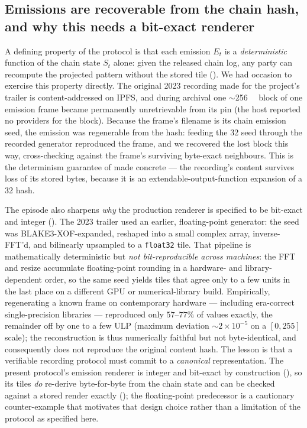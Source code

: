 \subsection{Emissions are recoverable from the chain hash, and why this needs a bit-exact renderer}
\label{sec:discussion:regeneration}

A defining property of the protocol is that each emission $E_t$ is a \emph{deterministic} function of the chain state $S_t$ alone: given the released chain log, any party can recompute the projected pattern without the stored tile (). We had occasion to exercise this property directly. The original 2023 recording made for the project's trailer is content-addressed on IPFS, and during archival one $\sim$\SI{256}{\kibi\byte} block of one emission frame became permanently unretrievable from its pin (the host reported no providers for the block). Because the frame's filename is its chain emission seed, the emission was regenerable from the hash: feeding the \SI{32}{\byte} seed through the recorded generator reproduced the frame, and we recovered the lost block this way, cross-checking against the frame's surviving byte-exact neighbours. This is the determinism guarantee of  made concrete --- the recording's content survives loss of its stored bytes, because it is an extendable-output-function expansion of a \SI{32}{\byte} hash.

The episode also sharpens \emph{why} the production renderer is specified to be bit-exact and integer (). The 2023 trailer used an earlier, floating-point generator: the seed was BLAKE3-XOF-expanded, reshaped into a small complex array, inverse-FFT'd, and bilinearly upsampled to a \texttt{float32} tile. That pipeline is mathematically deterministic but \emph{not bit-reproducible across machines}: the FFT and resize accumulate floating-point rounding in a hardware- and library-dependent order, so the same seed yields tiles that agree only to a few units in the last place on a different GPU or numerical-library build. Empirically, regenerating a known frame on contemporary hardware --- including era-correct single-precision libraries --- reproduced only $57$--$77\%$ of values exactly, the remainder off by one to a few ULP (maximum deviation $\sim 2\times10^{-5}$ on a $[0,255]$ scale); the reconstruction is thus numerically faithful but not byte-identical, and consequently does not reproduce the original content hash. The lesson is that a verifiable recording protocol must commit to a \emph{canonical} representation. The present protocol's emission renderer is integer and bit-exact by construction (), so its tiles \emph{do} re-derive byte-for-byte from the chain state and can be checked against a stored render exactly (); the floating-point predecessor is a cautionary counter-example that motivates that design choice rather than a limitation of the protocol as specified here.

